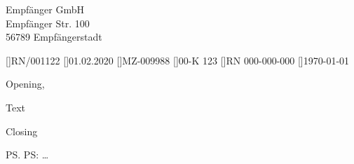 \documentclass[fontsize=12pt, version=last]{scrlttr2}
\begin{document}
\begin{letter}{
  Empfänger GmbH\\
  Empfänger Str. 100 \\
  56789 Empfängerstadt
}

[\yourrefname]{RN/001122}
[\yourmailname]{01.02.2020}
[\myrefname]{MZ-009988}
[\customername]{00-K 123}
[\invoicename]{RN 000-000-000}
[\datename]{\today}


\opening{Opening,}

Text 

\closing{Closing}

\ps PS: \dots



\end{letter}
\end{document}

